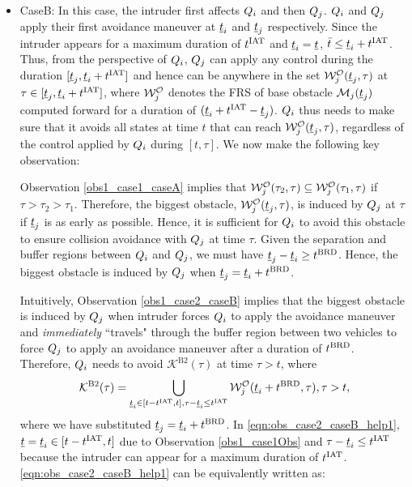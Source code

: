\begin{itemize}[leftmargin=*]
\item \label{sec:intruderObs_case2_caseB} CaseB: In this case, the intruder first affects $Q_i$ and then $Q_j$. $Q_i$ and $Q_j$ apply their first avoidance maneuver at $\underline{t}_i$ and $\underline{t}_j$ respectively. Since the intruder appears for a maximum duration of $t^\text{IAT}$ and $\underline{t}_i = \underline{t}$, $\bar{t} \leq \underline{t}_i + t^\text{IAT}$. Thus, from the perspective  of $Q_i$, $Q_j$ can apply any control during the duration $[\underline{t}_j, \underline{t}_i + t^\text{IAT}]$ and hence can be anywhere in the set $\mathcal{W}_{j}^{\mathcal{O}}(\underline{t}_j, \tau)$ at $\tau \in [\underline{t}_j, \underline{t}_i + t^\text{IAT}]$, where $\mathcal{W}_{j}^{\mathcal{O}}$ denotes the FRS of base obstacle $\mathcal{M}_j(\underline{t}_j)$ computed forward for a duration of $(\underline{t}_i + t^\text{IAT} - \underline{t}_j)$. $Q_i$ thus needs to make sure that it avoids all states at time $t$ that can reach $\mathcal{W}_{j}^{\mathcal{O}}(\underline{t}_j, \tau)$, regardless of the control applied by $Q_i$ during $[t, \tau]$. We now make the following key observation:
\begin{observation} \label{obs1_case2_caseB}
Observation \ref{obs1_case1_caseA} implies that $\mathcal{W}_{j}^{\mathcal{O}}(\tau_2, \tau) \subseteq \mathcal{W}_{j}^{\mathcal{O}}(\tau_1, \tau)$ if $\tau > \tau_2 > \tau_1$. Therefore, the biggest obstacle, $\mathcal{W}_{j}^{\mathcal{O}}(\underline{t}_j, \tau)$, is induced by $Q_j$ at $\tau$ if $\underline{t}_j$ is as early as possible. Hence, it is sufficient for $Q_i$ to avoid this obstacle to ensure collision avoidance with $Q_j$ at time $\tau$. Given the separation and buffer regions between $Q_i$ and $Q_j$, we must have $\underline{t}_j - \underline{t}_i \geq t^\text{BRD}$. Hence, the biggest obstacle is induced by $Q_j$ when $\underline{t}_j = \underline{t}_i + t^\text{BRD}$. 
\end{observation}
Intuitively, Observation \ref{obs1_case2_caseB} implies that the biggest obstacle is induced by $Q_j$ when intruder forces $Q_i$ to apply the avoidance maneuver and \textit{immediately} ``travels" through the buffer region between two vehicles to force $Q_j$ to apply an avoidance maneuver after a duration of $t^\text{BRD}$. Therefore, $Q_i$ needs to avoid $\mathcal{K}^{\text{B2}}(\tau)$ at time $\tau > t$, where 
\begin{equation} \label{eqn:obs_case2_caseB_help1}
\mathcal{K}^{\text{B2}}(\tau) =  \bigcup_{\tsa_i \in [t-\iat, t], \tau - \tsa_i \leq \iat} \frs_{j}^{\mathcal{O}}(\tsa_i + \brd, \tau), \tau>t,
\end{equation}
where we have substituted $\underline{t}_j = \underline{t}_i + t^\text{BRD}$. In \eqref{eqn:obs_case2_caseB_help1}, $\underline{t} = \underline{t}_i \in [t-t^\text{IAT}, t]$ due to Observation \ref{obs1_case1Obs} and $\tau - \underline{t}_i \leq t^\text{IAT}$ because the intruder can appear for a maximum duration of $t^\text{IAT}$. \eqref{eqn:obs_case2_caseB_help1} can be equivalently written as:  

\end{itemize}
